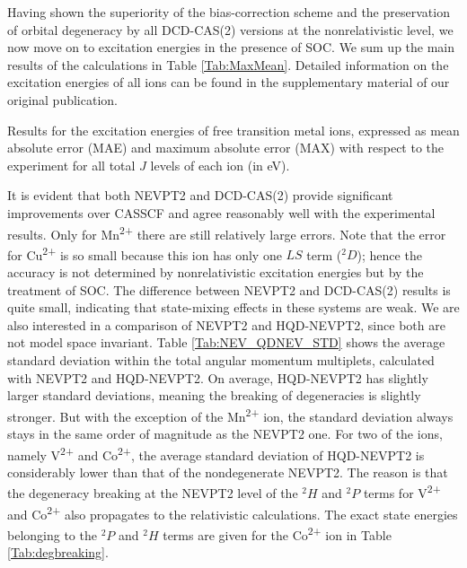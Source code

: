 Having shown the superiority of the bias-correction scheme and the preservation of orbital degeneracy by all DCD-CAS(2) versions at the nonrelativistic level, we now move on to excitation energies in the presence of SOC. We sum up the main results of the calculations in Table \ref{Tab:MaxMean}. Detailed information on the excitation energies of all ions can be found in the supplementary material of our original publication.\cite{LangN_2019_104104}
\begin{table}
\small
\centering
\ttabbox
{\caption[Results for the excitation energies of free transition metal ions.]{Results for the excitation energies of free transition metal ions, expressed as mean absolute error (MAE) and maximum absolute error (MAX) with respect to the experiment for all total $J$ levels of each ion (in eV).}
\label{Tab:MaxMean}}
{}
\end{table}
It is evident that both NEVPT2 and DCD-CAS(2) provide significant improvements over CASSCF and agree reasonably well with the experimental results. Only for Mn\textsuperscript{2+} there are still relatively large errors. Note that the error for Cu\textsuperscript{2+} is so small because this ion has only one $LS$ term ($^2D$); hence the accuracy is not determined by nonrelativistic excitation energies but by the treatment of SOC. The difference between NEVPT2 and DCD-CAS(2) results is quite small, indicating that state-mixing effects in these systems are weak.
We are also interested in a comparison of NEVPT2 and HQD-NEVPT2, since both are not model space invariant. Table \ref{Tab:NEV_QDNEV_STD} shows the average standard deviation within the total angular momentum multiplets, calculated with NEVPT2 and HQD-NEVPT2. On average, HQD-NEVPT2 has slightly larger standard deviations, meaning the breaking of degeneracies is slightly stronger. But with the exception of the Mn\textsuperscript{2+} ion, the standard deviation always stays in the same order of magnitude as the NEVPT2 one. For two of the ions, namely V\textsuperscript{2+} and Co\textsuperscript{2+}, the average standard deviation of HQD-NEVPT2 is considerably lower than that of the nondegenerate NEVPT2.
The reason is that the degeneracy breaking at the NEVPT2 level of the $^2H$ and $^2P$ terms for V\textsuperscript{2+} and Co\textsuperscript{2+} also propagates to the relativistic calculations.
The exact state energies belonging to the $^2P$ and $^2H$ terms are given for the Co\textsuperscript{2+} ion in Table \ref{Tab:degbreaking}. 
